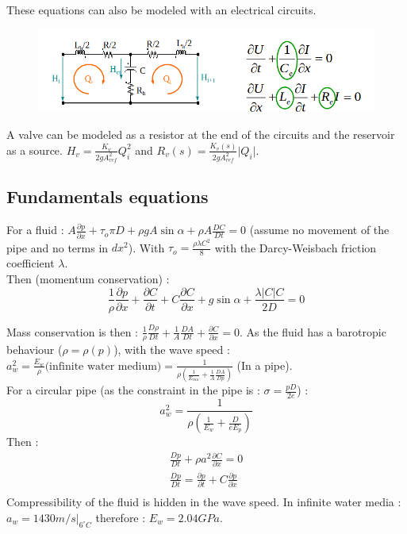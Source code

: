 \documentclass[../main.tex]{subfiles}
\begin{document}
These equations can also be modeled with an electrical circuits. \\
\begin{figure}[hbt!]
    \centering
    \includegraphics[width=0.5\linewidth]{IMAGES/Hydraulic/Screenshot from 2025-02-21 11-54-39.png}
\end{figure}

A valve can be modeled as a resistor at the end of the circuits and the reservoir as a source. $H_v = \frac{K_v}{2gA_{ref}^2}Q_i^2$ and $R_v(s) = \frac{K_v(s) }{2gA_{ref}^2} \lvert Q_i\rvert$.\\

\subsection{Fundamentals equations}
For a fluid : $A \frac{\partial p}{\partial x} + \tau_o \pi D + \rho g A \sin \alpha + \rho A \frac{DC}{Dt} = 0$ (assume no movement of the pipe and no terms in $dx^2$). With $\tau_o = \frac{\rho \lambda C^2}{8}$ with the Darcy-Weisbach friction coefficient $\lambda$.\\
Then (momentum conservation) : \begin{equation}
    \frac{1}{\rho} \frac{\partial p}{\partial x} + \frac{\partial C}{\partial t} + C \frac{\partial C}{\partial x} + g\sin \alpha + \frac{\lambda \lvert C\rvert C}{2D}=0
\end{equation}

Mass conservation is then : $\frac{1}{\rho} \frac{D\rho}{Dt} + \frac{1}{A} \frac{DA}{Dt} + \frac{\partial C}{\partial x} = 0$. As the fluid has a barotropic behaviour ($\rho = \rho(p)$), with the wave speed : $a_w^2 = \frac{E_w}{\rho} \text{(infinite water medium)} = \frac{1}{\rho(\frac{1}{E_{eau}} + \frac{1}{A} \frac{DA}{Dp})}$ (In a pipe).\\
For a circular pipe (as the constraint in the pipe is : $\sigma = \frac{pD}{2e}$) : \begin{equation}a_w^2 = \frac{1}{\rho (\frac{1}{E_w} + \frac{D}{eE_p})}\end{equation}
Then : \begin{equation}\begin{gathered}
    \frac{Dp}{Dt} + \rho a^2 \frac{\partial C}{\partial x}=0\\
    \frac{Dp}{Dt} = \frac{\partial p}{\partial t} + C \frac{\partial p}{\partial x}\\
    \end{gathered}
\end{equation}
\warning Compressibility of the fluid is hidden in the wave speed. In infinite water media : $a_w = 1430m/s\rvert_{6^\circ C}$ therefore : $E_w = 2.04GPa$. 
\end{document}

